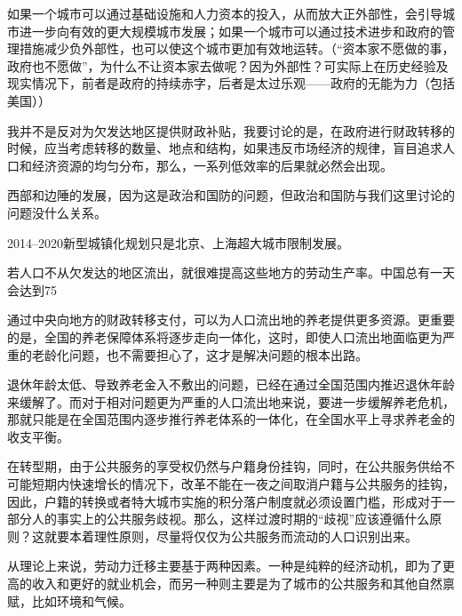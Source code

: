 如果一个城市可以通过基础设施和人力资本的投入，从而放大正外部性，会引导城市进一步向有效的更大规模城市发展；如果一个城市可以通过技术进步和政府的管理措施减少负外部性，也可以使这个城市更加有效地运转。（“资本家不愿做的事，政府也不愿做”，为什么不让资本家去做呢？因为外部性？可实际上在历史经验及现实情况下，前者是政府的持续赤字，后者是太过乐观——政府的无能为力（包括美国））

我并不是反对为欠发达地区提供财政补贴，我要讨论的是，在政府进行财政转移的时候，应当考虑转移的数量、地点和结构，如果违反市场经济的规律，盲目追求人口和经济资源的均匀分布，那么，一系列低效率的后果就必然会出现。

西部和边陲的发展，因为这是政治和国防的问题，但政治和国防与我们这里讨论的问题没什么关系。

2014--2020新型城镇化规划只是北京、上海超大城市限制发展。

若人口不从欠发达的地区流出，就很难提高这些地方的劳动生产率。中国总有一天会达到75%

通过中央向地方的财政转移支付，可以为人口流出地的养老提供更多资源。更重要的是，全国的养老保障体系将逐步走向一体化，这时，即使人口流出地面临更为严重的老龄化问题，也不需要担心了，这才是解决问题的根本出路。

退休年龄太低、导致养老金入不敷出的问题，已经在通过全国范围内推迟退休年龄来缓解了。而对于相对问题更为严重的人口流出地来说，要进一步缓解养老危机，那就只能是在全国范围内逐步推行养老体系的一体化，在全国水平上寻求养老金的收支平衡。

在转型期，由于公共服务的享受权仍然与户籍身份挂钩，同时，在公共服务供给不可能短期内快速增长的情况下，改革不能在一夜之间取消户籍与公共服务的挂钩，因此，户籍的转换或者特大城市实施的积分落户制度就必须设置门槛，形成对于一部分人的事实上的公共服务歧视。那么，这样过渡时期的“歧视”应该遵循什么原则？这就要本着理性原则，尽量将仅仅为公共服务而流动的人口识别出来。

从理论上来说，劳动力迁移主要基于两种因素。一种是纯粹的经济动机，即为了更高的收入和更好的就业机会，而另一种则主要是为了城市的公共服务和其他自然禀赋，比如环境和气候。

